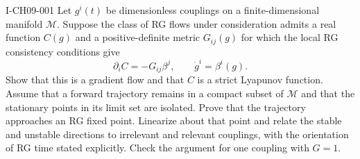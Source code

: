 \begin{exercise}{I-CH09-001}
Let $g^i(t)$ be dimensionless couplings on a finite-dimensional manifold
$\mathcal M$.  Suppose the class of RG flows under consideration admits a
real function $C(g)$ and a positive-definite metric $G_{ij}(g)$ for which the
local RG consistency conditions give
\[
  \partial_i C=-G_{ij}\beta^j,
  \qquad \dot g^i=\beta^i(g).
\]
Show that this is a gradient flow and that $C$ is a strict Lyapunov function.
Assume that a forward trajectory remains in a compact subset of $\mathcal M$
and that the stationary points in its limit set are isolated.  Prove that the
trajectory approaches an RG fixed point.  Linearize about that point and
relate the stable and unstable directions to irrelevant and relevant
couplings, with the orientation of RG time stated explicitly.  Check the
argument for one coupling with $G=1$.
\end{exercise}
